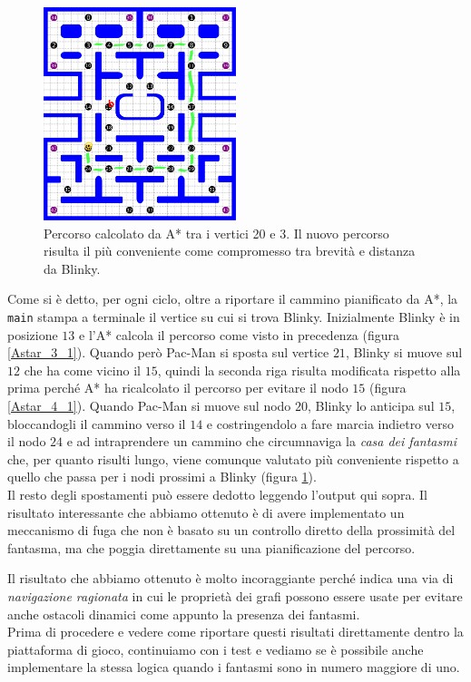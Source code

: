 \documentclass[8pt]{book}
\begin{document}
\begin{figure}
  \centering
  \includegraphics[width=0.5\textwidth]{img/Astar_5.png}
  \caption{Percorso calcolato da A* tra i vertici 20 e 3. Il nuovo percorso risulta il più conveniente come compromesso tra brevità e distanza da Blinky.}
  \label{Astar_5}
\end{figure}
 

Come si è detto, per ogni ciclo, oltre a riportare il cammino pianificato da A*, la \texttt{main} stampa a terminale il vertice su cui si trova Blinky. Inizialmente Blinky è in posizione $13$ e l'A* calcola il percorso come visto in precedenza (figura \ref{Astar_3_1}). Quando però Pac-Man si sposta sul vertice $21$, Blinky si muove sul $12$ che ha come vicino il $15$, quindi la seconda riga risulta modificata rispetto alla prima perché A* ha ricalcolato il percorso per evitare il nodo $15$ (figura \ref{Astar_4_1}). Quando Pac-Man si muove sul nodo $20$, Blinky lo anticipa sul $15$, bloccandogli il cammino verso il $14$ e costringendolo a fare marcia indietro verso il nodo $24$ e ad intraprendere un cammino che circumnaviga la \emph{casa dei fantasmi} che, per quanto risulti lungo, viene comunque valutato più conveniente rispetto a quello che passa per i nodi prossimi a Blinky (figura \ref{Astar_5}).\\
Il resto degli spostamenti può essere dedotto leggendo l'output qui sopra. Il risultato interessante che abbiamo ottenuto è di avere implementato un meccanismo di fuga che non è basato su un controllo diretto della prossimità del fantasma, ma che poggia direttamente su una pianificazione del percorso.

Il risultato che abbiamo ottenuto è molto incoraggiante perché indica una via di \emph{navigazione ragionata} in cui le proprietà dei grafi possono essere usate per evitare anche ostacoli dinamici come appunto la presenza dei fantasmi.\\
Prima di procedere e vedere come riportare questi risultati direttamente dentro la piattaforma di gioco, continuiamo con i test e vediamo se è possibile anche implementare la stessa logica quando i fantasmi sono in numero maggiore di uno.
\end{document}
